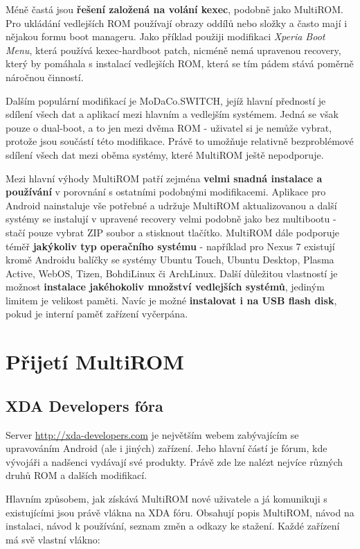 \documentclass[12pt, a4paper, oneside]{article}
\newcommand{\B}{\textbf} %
\newcommand{\It}{\textit}  %
\begin{document}
Méně častá jsou \B{řešení založená na volání kexec}, podobně jako MultiROM. Pro ukládání vedlejších ROM používají obrazy oddílů nebo složky a často mají i nějakou formu boot manageru. Jako příklad použiji modifikaci \It{Xperia Boot Menu}\cite{xperia-boot-menu}, která používá kexec-hardboot patch, nicméně nemá upravenou recovery, který by pomáhala s instalací vedlejších ROM, která se tím pádem stává poměrně náročnou činností.

Dalším populární modifikací je MoDaCo.SWITCH\cite{modaco-switch}, jejíž hlavní předností je sdílení všech dat a aplikací mezi hlavním a vedlejším systémem. Jedná se však pouze o dual-boot, a to jen mezi dvěma ROM - uživatel si je nemůže vybrat, protože jsou součástí této modifikace. Právě to umožňuje relativně bezproblémové sdílení všech dat mezi oběma systémy, které MultiROM ještě nepodporuje.

Mezi hlavní výhody MultiROM patří zejména \B{velmi snadná instalace a používání} v porovnání s ostatními podobnými modifikacemi. Aplikace pro Android nainstaluje vše potřebné a udržuje MultiROM aktualizovanou a další systémy se instalují v upravené recovery velmi podobně jako bez multibootu - stačí pouze vybrat ZIP soubor a stisknout tlačítko. MultiROM dále podporuje téměř \B{jakýkoliv typ operačního systému} - například pro Nexus 7 existují kromě Androidu balíčky se systémy Ubuntu Touch, Ubuntu Desktop, Plasma Active, WebOS, Tizen, BohdiLinux či ArchLinux. Další důležitou vlastností je možnost \B{instalace jakéhokoliv množství vedlejších systémů}, jediným limitem je velikost paměti. Navíc je možné \B{instalovat i na USB flash disk}, pokud je interní paměť zařízení vyčerpána.

\section{Přijetí MultiROM}
\subsection{XDA Developers fóra}
Server \url{http://xda-developers.com} je největším webem zabývajícím se upravováním Android (ale i jiných) zařízení. Jeho hlavní částí je fórum, kde vývojáři a nadšenci vydávají své produkty. Právě zde lze nalézt nejvíce různých druhů ROM a dalších modifikací.

Hlavním způsobem, jak získává MultiROM nové uživatele a já komunikuji s existujícími jsou právě vlákna na XDA fóru. Obsahují popis MultiROM, návod na instalaci, návod k používání, seznam změn a odkazy ke stažení. Každé zařízení má svě vlastní vlákno:
\end{document}
